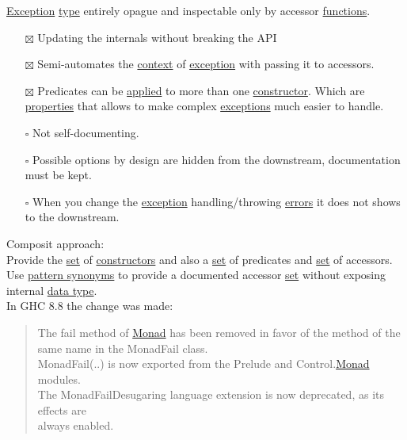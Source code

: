 \documentclass[a4paper,14pt,oneside]{book}
\begin{document}
\hyperref[org4a5dbbf]{Exception} \hyperref[orga286a54]{type} entirely opague and inspectable only by accessor \hyperref[org97ed87c]{functions}.\\
\begin{itemize}
\item[{$\boxtimes$}] Updating the internals without breaking the API\\
\item[{$\boxtimes$}] Semi-automates the \hyperref[orgacc09e2]{context} of \hyperref[org4a5dbbf]{exception} with passing it to accessors.\\
\item[{$\boxtimes$}] Predicates can be \hyperref[orga89349a]{applied} to more than one \hyperref[org43f0267]{constructor}. Which are \hyperref[org7d3e89a]{properties} that allows to make complex \hyperref[org21526fc]{exceptions} much easier to handle.\\
\item[{$\square$}] Not self-documenting.\\
\item[{$\square$}] Possible options by design are hidden from the downstream, documentation must be kept.\\
\item[{$\square$}] When you change the \hyperref[org4a5dbbf]{exception} handling/throwing \hyperref[orge2e4688]{errors} it does not shows to the downstream.\\
\end{itemize}

Composit approach:\\
Provide the \hyperref[orgbe2ddb3]{set} of \hyperref[org52de2e6]{constructors} and also a \hyperref[orgbe2ddb3]{set} of predicates and \hyperref[orgbe2ddb3]{set} of accessors.\\
Use \hyperref[org4bed8be]{pattern synonyms} to provide a documented accessor \hyperref[orgbe2ddb3]{set} without exposing internal \hyperref[orgc059977]{data type}.\\

In GHC 8.8 the change was made:\\
\begin{quote}
The fail method of \hyperref[org0668aa4]{Monad} has been removed in favor of the method of the same name in the MonadFail class.\\

MonadFail(..) is now exported from the Prelude and Control.\hyperref[org0668aa4]{Monad} modules.\\
The MonadFailDesugaring language extension is now deprecated, as its effects are\\
always enabled.\\
\end{quote}
\end{document}

